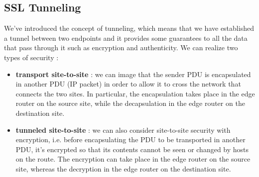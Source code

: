 \documentclass[11pt]{article}
\begin{document}
\subsection{SSL Tunneling}
We've introduced the concept of tunneling, which means that we have established a tunnel between two endpoints and it provides some guarantees to all the data that pass through it such as encryption and authenticity. We can realize two types of security :
\begin{itemize}
\item \textbf{transport site-to-site} : we can image that the sender PDU is encapsulated in another PDU (IP packet) in order to allow it to cross the network that connects the two sites. In particular, the encapsulation takes place in the edge router on the source site, while the decapsulation in the edge router on the destination site.
\item \textbf{tunneled site-to-site} : we can also consider site-to-site security with encryption, i.e. before encapsulating the PDU to be transported in another PDU, it's encrypted so that its contents cannot be seen or changed by hosts on the route. The encryption can take place in the edge router on the source site, whereas the decryption in the edge router on the destination site.
\end{itemize}
\end{document}
